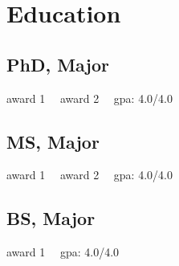\documentclass[letterpaper,12pt]{werner} %
\begin{document}
\section{Education} 

\begin{minipage}[t]{0.35\textwidth}

\subsection{PhD, Major} \vspace{2pt}

 \vspace{3pt}
{\justify award 1 \, \lildot \, award 2 \, \lildot \, gpa: 4.0/4.0}

\end{minipage}
\hfill
\begin{minipage}[t]{0.32\textwidth}

\subsection{MS, Major} \vspace{2pt}

 \vspace{3pt}
{\justify award 1 \, \lildot \, award 2 \, \lildot \, gpa: 4.0/4.0}

\end{minipage}
\hfill
\begin{minipage}[t]{0.30\textwidth}

\subsection{BS, Major} \vspace{2pt}

 \vspace{3pt}
{\justify award 1 \, \lildot \, gpa: 4.0/4.0}

\end{minipage}

\vspace{7pt}
\sectionspace

\end{document}
